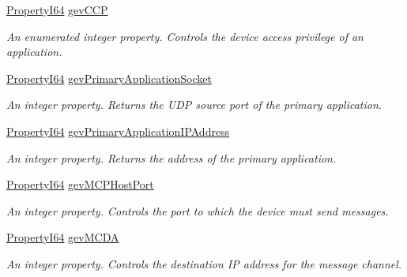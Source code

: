 \begin{DoxyCompactItemize}
\hyperlink{group___common_interface_ga81749b2696755513663492664a18a893}{Property\+I64} \hyperlink{classmv_i_m_p_a_c_t_1_1acquire_1_1_gen_i_cam_1_1_transport_layer_control_aaba3d3751e5771b738ed06ebb9800871}{gev\+C\+C\+P}
\begin{DoxyCompactList}\small\item\em An enumerated integer property. Controls the device access privilege of an application. \end{DoxyCompactList}\item 
\hyperlink{group___common_interface_ga81749b2696755513663492664a18a893}{Property\+I64} \hyperlink{classmv_i_m_p_a_c_t_1_1acquire_1_1_gen_i_cam_1_1_transport_layer_control_ab1741fd99ef294ac244e8e9fe7acdfbb}{gev\+Primary\+Application\+Socket}
\begin{DoxyCompactList}\small\item\em An integer property. Returns the U\+D\+P source port of the primary application. \end{DoxyCompactList}\item 
\hyperlink{group___common_interface_ga81749b2696755513663492664a18a893}{Property\+I64} \hyperlink{classmv_i_m_p_a_c_t_1_1acquire_1_1_gen_i_cam_1_1_transport_layer_control_a42fe0955f1b5a223d9e904e2fcf341b2}{gev\+Primary\+Application\+I\+P\+Address}
\begin{DoxyCompactList}\small\item\em An integer property. Returns the address of the primary application. \end{DoxyCompactList}\item 
\hyperlink{group___common_interface_ga81749b2696755513663492664a18a893}{Property\+I64} \hyperlink{classmv_i_m_p_a_c_t_1_1acquire_1_1_gen_i_cam_1_1_transport_layer_control_aa93010c6b4d9b6e13b957c46b66c0acb}{gev\+M\+C\+P\+Host\+Port}
\begin{DoxyCompactList}\small\item\em An integer property. Controls the port to which the device must send messages. \end{DoxyCompactList}\item 
\hyperlink{group___common_interface_ga81749b2696755513663492664a18a893}{Property\+I64} \hyperlink{classmv_i_m_p_a_c_t_1_1acquire_1_1_gen_i_cam_1_1_transport_layer_control_afe3ff79384a5b2e374001dc5d30aadbe}{gev\+M\+C\+D\+A}
\begin{DoxyCompactList}\small\item\em An integer property. Controls the destination I\+P address for the message channel. \end{DoxyCompactList}\item 

\end{DoxyCompactItemize}
